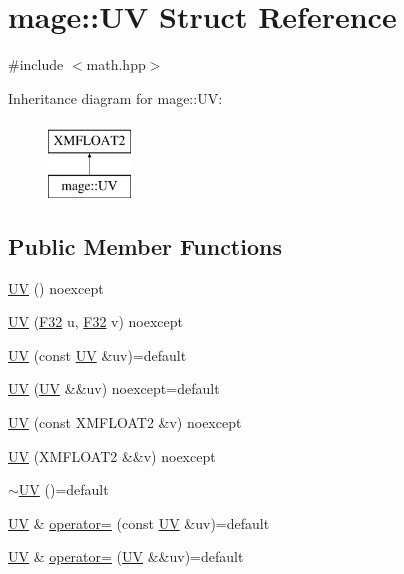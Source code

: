 \hypertarget{structmage_1_1_u_v}{}\section{mage\+:\+:UV Struct Reference}
\label{structmage_1_1_u_v}


{\ttfamily \#include $<$math.\+hpp$>$}

Inheritance diagram for mage\+:\+:UV\+:\begin{figure}[H]
\begin{center}
\leavevmode
\includegraphics[height=2.000000cm]{structmage_1_1_u_v}
\end{center}
\end{figure}
\subsection*{Public Member Functions}
\begin{DoxyCompactItemize}
\item 
\hyperlink{structmage_1_1_u_v_a2b7b6f75876aab6a932cb283942eec99}{UV} () noexcept
\item 
\hyperlink{structmage_1_1_u_v_a4496eed67c10630433143d8e85dd6ebb}{UV} (\hyperlink{namespacemage_aa97e833b45f06d60a0a9c4fc22ae02c0}{F32} u, \hyperlink{namespacemage_aa97e833b45f06d60a0a9c4fc22ae02c0}{F32} v) noexcept
\item 
\hyperlink{structmage_1_1_u_v_a6ae26e6be3db3b2b2fb7e6b8df76fc24}{UV} (const \hyperlink{structmage_1_1_u_v}{UV} \&uv)=default
\item 
\hyperlink{structmage_1_1_u_v_a47ad5c6b2fa30ef9a91bc875d71131b0}{UV} (\hyperlink{structmage_1_1_u_v}{UV} \&\&uv) noexcept=default
\item 
\hyperlink{structmage_1_1_u_v_a20ccaa4ee48cf6a9d072295f62461f7d}{UV} (const X\+M\+F\+L\+O\+A\+T2 \&v) noexcept
\item 
\hyperlink{structmage_1_1_u_v_a7a1800a0330d2ae8705418543fed6465}{UV} (X\+M\+F\+L\+O\+A\+T2 \&\&v) noexcept
\item 
\hyperlink{structmage_1_1_u_v_a9389be8cc9bb64861b69f79b44b6dd1b}{$\sim$\+UV} ()=default
\item 
\hyperlink{structmage_1_1_u_v}{UV} \& \hyperlink{structmage_1_1_u_v_a3ef9497749cc5a99285b110d3f5a59aa}{operator=} (const \hyperlink{structmage_1_1_u_v}{UV} \&uv)=default
\item 
\hyperlink{structmage_1_1_u_v}{UV} \& \hyperlink{structmage_1_1_u_v_ab3a52afacb7c0b6e8f702888f66847f9}{operator=} (\hyperlink{structmage_1_1_u_v}{UV} \&\&uv)=default
\end{DoxyCompactItemize}


